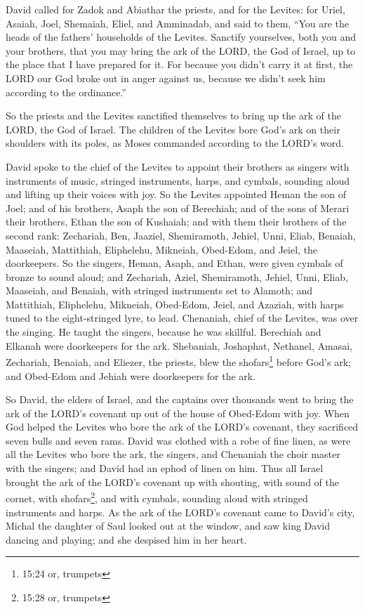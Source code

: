 \myverse{}David called for Zadok and Abiathar the priests, and for the
Levites: for Uriel, Asaiah, Joel, Shemaiah, Eliel, and Amminadab,
\myverse{}and said to them, “You are the heads of the fathers’ households of the Levites.
Sanctify yourselves, both you and your brothers, that you may bring the ark of the LORD, the God of Israel,
up to the place that I have prepared for it.
\myverse{}For because you didn’t carry it at first, the LORD our God broke out in anger
against us, because we didn’t seek him according to the ordinance.”

\myverse{}So the priests and the Levites sanctified themselves to bring
up the ark of the LORD, the God of Israel.
\myverse{}The children of the Levites bore God’s ark on their shoulders with its poles,
as Moses commanded according to the LORD’s word.

\myverse{}David spoke to the chief of the Levites to appoint their brothers
as singers with instruments of music, stringed instruments, harps, and cymbals, sounding aloud and lifting
up their voices with joy.
\myverse{}So the Levites appointed Heman the son of Joel; and of his brothers, Asaph
the son of Berechiah; and of the sons of Merari their brothers, Ethan the son of Kushaiah;
\myverse{}and with them their brothers of the second rank: Zechariah, Ben, Jaaziel,
Shemiramoth, Jehiel, Unni, Eliab, Benaiah, Maaseiah, Mattithiah, Eliphelehu, Mikneiah, Obed-Edom, and
Jeiel, the doorkeepers.
\myverse{}So the singers, Heman, Asaph, and Ethan, were given cymbals of bronze to
sound aloud;
\myverse{}and Zechariah, Aziel, Shemiramoth, Jehiel, Unni, Eliab, Maaseiah, and Benaiah,
with stringed instruments set to Alamoth;
\myverse{}and Mattithiah, Eliphelehu, Mikneiah, Obed-Edom, Jeiel, and Azaziah, with
harps tuned to the eight-stringed lyre, to lead.
\myverse{}Chenaniah, chief of the Levites, was over the singing. He taught the singers,
because he was skillful.
\myverse{}Berechiah and Elkanah were doorkeepers for the ark.
\myverse{}Shebaniah, Joshaphat, Nethanel, Amasai, Zechariah, Benaiah, and Eliezer,
the priests, blew the shofars\footnote{15:24 or, trumpets} before God’s ark; and Obed-Edom and Jehiah
were doorkeepers for the ark.

\myverse{}So David, the elders of Israel, and the captains over thousands
went to bring the ark of the LORD’s covenant up out of the house of Obed-Edom with joy.
\myverse{}When God helped the Levites who bore the ark of the LORD’s covenant, they
sacrificed seven bulls and seven rams.
\myverse{}David was clothed with a robe of fine linen, as were all the Levites who
bore the ark, the singers, and Chenaniah the choir master with the singers; and David had an ephod of
linen on him.
\myverse{}Thus all Israel brought the ark of the LORD’s covenant up with shouting,
with sound of the cornet, with shofars\footnote{15:28 or, trumpets}, and with cymbals, sounding aloud
with stringed instruments and harps.
\myverse{}As the ark of the LORD’s covenant came to David’s city, Michal the daughter
of Saul looked out at the window, and saw king David dancing and playing; and she despised him in her
heart.


